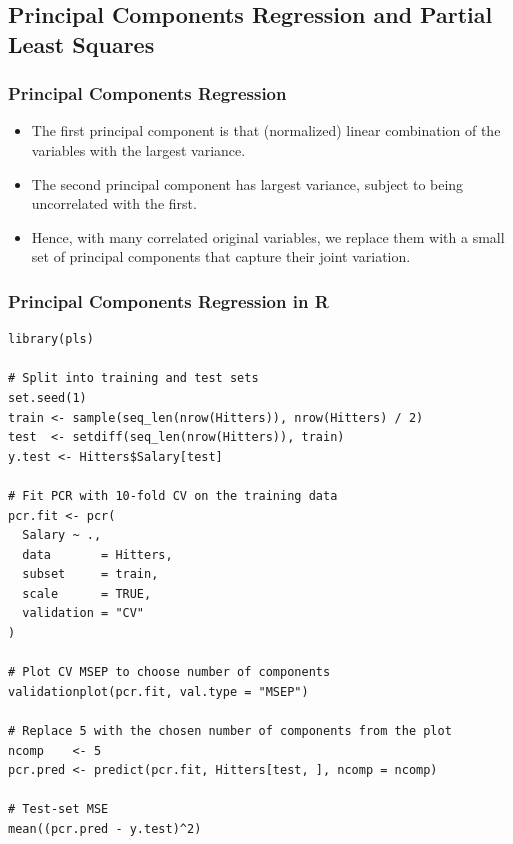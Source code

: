 \documentclass{article}
\begin{document}
\subsection{Principal Components Regression and Partial Least Squares}

\subsubsection{Principal Components Regression}
\begin{itemize}
    \item The first principal component is that (normalized) linear combination of the variables with the largest variance.
    \item The second principal component has largest variance, subject to being uncorrelated with the first.
    \item Hence, with many correlated original variables, we replace them with a small set of principal components that capture their joint variation.
\end{itemize}

\subsubsection{Principal Components Regression in R}
\begin{lstlisting}
library(pls)

# Split into training and test sets
set.seed(1)
train <- sample(seq_len(nrow(Hitters)), nrow(Hitters) / 2)
test  <- setdiff(seq_len(nrow(Hitters)), train)
y.test <- Hitters$Salary[test]

# Fit PCR with 10-fold CV on the training data
pcr.fit <- pcr(
  Salary ~ .,
  data       = Hitters,
  subset     = train,
  scale      = TRUE,
  validation = "CV"
)

# Plot CV MSEP to choose number of components
validationplot(pcr.fit, val.type = "MSEP")

# Replace 5 with the chosen number of components from the plot
ncomp    <- 5
pcr.pred <- predict(pcr.fit, Hitters[test, ], ncomp = ncomp)

# Test-set MSE
mean((pcr.pred - y.test)^2)
\end{lstlisting}
\end{document}
